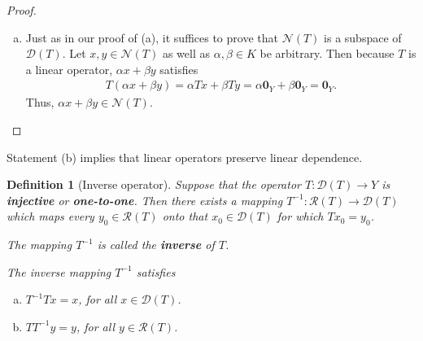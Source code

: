 \documentclass[11pt]{article}
\theoremstyle{mystyle}
\newtheorem{defn}{Definition}[section]
\newcommand{\0}{\mathbf{0}}
\begin{document}
\begin{proof}
\begin{enumerate}[(a)]
    \item Just as in our proof of (a), it suffices to prove that $\mathscr{N}(T)$ is a subspace of $\mathscr{D}(T)$. Let $x, y \in \mathscr{N}(T)$ as well as $\alpha, \beta \in K$ be arbitrary. Then because $T$ is a linear operator, $\alpha x + \beta y$ satisfies
    \begin{align*}
        T(\alpha x + \beta y) = \alpha Tx + \beta Ty = \alpha \0_Y + \beta \0_Y = \0_Y.
    \end{align*}
    Thus, $\alpha x + \beta y \in \mathscr{N}(T)$.
\end{enumerate}
\end{proof}
Statement (b) implies that linear operators preserve linear dependence. 

\begin{defn}[Inverse operator]
Suppose that the operator $T: \mathscr{D}(T) \longrightarrow Y$ is \textbf{injective} or \textbf{one-to-one}. Then there exists a mapping $T^{-1}: \mathscr{R}(T) \longrightarrow \mathscr{D}(T)$ which maps every $y_0 \in \mathscr{R}(T)$ onto that $x_0 \in \mathscr{D}(T)$ for which $Tx_0 = y_0$.

The mapping $T^{-1}$ is called the \textbf{inverse} of $T$.

The inverse mapping $T^{-1}$ satisfies 
\begin{enumerate}[(a)]
    \item $T^{-1}Tx = x$, \qquad for all $x \in \mathscr{D}(T)$.
    \item $TT^{-1}y = y$, \qquad for all $y \in \mathscr{R}(T)$.
\end{enumerate}
\end{defn}
\end{document}
